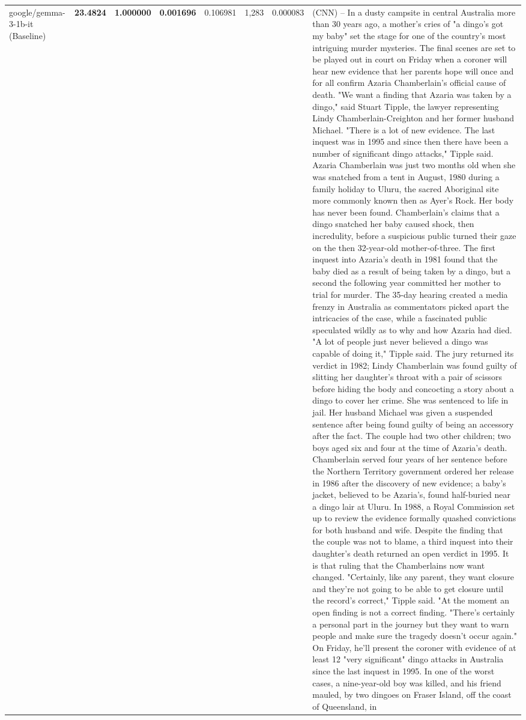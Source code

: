\begin{table}[H]
\begin{tabular}{llrlllll}
\midrule
google/gemma-3-1b-it (Baseline) & \bfseries 23.4824 & \bfseries 1.000000 & \bfseries 0.001696 & 0.106981 & 1,283 & 0.000083 & (CNN) -- In a dusty campsite in central Australia more than 30 years ago, a mother's cries of "a dingo's got my baby" set the stage for one of the country's most intriguing murder mysteries. The final scenes are set to be played out in court on Friday when a coroner will hear new evidence that her parents hope will once and for all confirm Azaria Chamberlain's official cause of death. "We want a finding that Azaria was taken by a dingo," said Stuart Tipple, the lawyer representing Lindy Chamberlain-Creighton and her former husband Michael. "There is a lot of new evidence. The last inquest was in 1995 and since then there have been a number of significant dingo attacks," Tipple said. Azaria Chamberlain was just two months old when she was snatched from a tent in August, 1980 during a family holiday to Uluru, the sacred Aboriginal site more commonly known then as Ayer's Rock. Her body has never been found. Chamberlain's claims that a dingo snatched her baby caused shock, then incredulity, before a suspicious public turned their gaze on the then 32-year-old mother-of-three. The first inquest into Azaria's death in 1981 found that the baby died as a result of being taken by a dingo, but a second the following year committed her mother to trial for murder. The 35-day hearing created a media frenzy in Australia as commentators picked apart the intricacies of the case, while a fascinated public speculated wildly as to why and how Azaria had died. "A lot of people just never believed a dingo was capable of doing it," Tipple said. The jury returned its verdict in 1982; Lindy Chamberlain was found guilty of slitting her daughter's throat with a pair of scissors before hiding the body and concocting a story about a dingo to cover her crime. She was sentenced to life in jail. Her husband Michael was given a suspended sentence after being found guilty of being an accessory after the fact. The couple had two other children; two boys aged six and four at the time of Azaria's death. Chamberlain served four years of her sentence before the Northern Territory government ordered her release in 1986 after the discovery of new evidence; a baby's jacket, believed to be Azaria's, found half-buried near a dingo lair at Uluru. In 1988, a Royal Commission set up to review the evidence formally quashed convictions for both husband and wife. Despite the finding that the couple was not to blame, a third inquest into their daughter's death returned an open verdict in 1995. It is that ruling that the Chamberlains now want changed. "Certainly, like any parent, they want closure and they're not going to be able to get closure until the record's correct," Tipple said. "At the moment an open finding is not a correct finding. "There's certainly a personal part in the journey but they want to warn people and make sure the tragedy doesn't occur again." On Friday, he'll present the coroner with evidence of at least 12 "very significant" dingo attacks in Australia since the last inquest in 1995. In one of the worst cases, a nine-year-old boy was killed, and his friend mauled, by two dingoes on Fraser Island, off the coast of Queensland, in 
\end{tabular}
\end{table}
